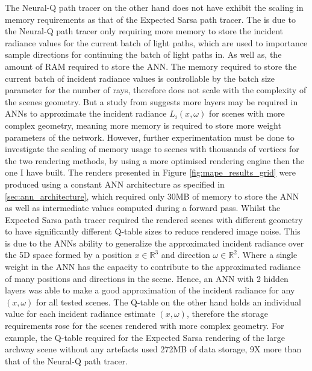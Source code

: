 \documentclass[../dissertation.tex]{subfiles}
\begin{document}
The Neural-Q path tracer on the other hand does not have exhibit the scaling in memory requirements as that of the Expected Sarsa path tracer. The is due to the Neural-Q path tracer only requiring more memory to store the incident radiance values for the current batch of light paths, which are used to importance sample directions for continuing the batch of light paths in. As well as, the amount of RAM required to store the ANN. The memory required to store the current batch of incident radiance values is controllable by the batch size parameter for the number of rays, therefore does not scale with the complexity of the scenes geometry. But a study from \cite{ren2013global} suggests more layers may be required in ANNs to approximate the incident radiance $L_i(x, \omega)$ for scenes with more complex geometry, meaning more memory is required to store more weight parameters of the network. However, further experimentation must be done to investigate the scaling of memory usage to scenes with thousands of vertices for the two rendering methods, by using a more optimised rendering engine then the one I have built. The renders presented in Figure \ref{fig:mape_results_grid} were produced using a constant ANN architecture as specified in \ref{sec:ann_architecture}, which required only 30MB of memory to store the ANN as well as intermediate values computed during a forward pass. Whilst the Expected Sarsa path tracer required the rendered scenes with different geometry to have significantly different Q-table sizes to reduce rendered image noise. This is due to the ANNs ability to generalize the approximated incident radiance over the 5D space formed by a position $x \in \mathbb{R}^3$ and direction $\omega \in \mathbb{R}^2$. Where a single weight in the ANN has the capacity to contribute to the approximated radiance of many positions and directions in the scene. Hence, an ANN with 2 hidden layers was able to make a good approximation of the incident radiance for any $(x, \omega)$ for all tested scenes. The Q-table on the other hand holds an individual value for each incident radiance estimate $(x,\omega)$, therefore the storage requirements rose for the scenes rendered with more complex geometry. For example, the Q-table required for the Expected Sarsa rendering of the large archway scene without any artefacts used 272MB of data storage, 9X more than that of the Neural-Q path tracer.


\end{document}
